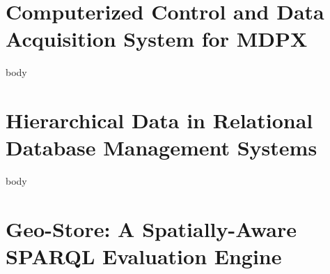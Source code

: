 \documentclass[12pt]{report}
\begin{document}
\chapter{Computerized Control and Data Acquisition System for MDPX}
{body}

\chapter{Hierarchical Data in Relational Database Management Systems}
{body}


\chapter{Geo-Store: A Spatially-Aware SPARQL Evaluation Engine}


%

%
%




\end{document}
